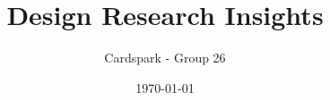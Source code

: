 \documentclass{article}
\begin{document}
\title{Design Research Insights}

\author{Cardspark - Group 26}

\date{\today}

\maketitle  
\end{document}
